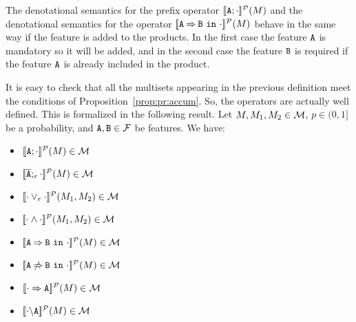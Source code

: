 The denotational semantics for the prefix operator
$[\![\mathtt{A};\cdot]\!]^{\cal P}(M)$
and the denotational semantics for the operator
$[\![\mathtt{A}\mathbin{\Rightarrow}\mathtt{B}\ \mathtt{in}\ \cdot]\!]^{\cal P}(M)$
behave in the same way if the feature is added
to the products. In the first case the feature $\mathtt{A}$ is mandatory
so it will be added, and in the second case the feature $\mathtt{B}$ is required
if the feature $\mathtt{A}$ is already included in the product.

It is easy to check that all the multisets appearing in the previous
definition meet the conditions of Proposition~\ref{prop:pr:accum}. So,
the operators are actually well defined. This is formalized in the
following result.
\bprop\label{prp:domain:prob}
  Let  $M,M_{1}, M_{2}\in{\cal M}$,
  $p\in(0,1]$ be a probability, and
  $\mathtt{A},\mathtt{B}\in{\cal F}$ be features. We have:
\begin{multicols}{2}
	\begin{itemize}
		\item $[\![\mathtt{A};\cdot]\!]^{\cal P}(M)\in{\cal M}$
		\item $[\![\overline{\mathtt{A}};_{r}\cdot]\!]^{\cal P}(M)\in{\cal M}$
		\item $[\![\cdot\mathbin{\lor}_{r}\cdot]\!]^{\cal P}(M_{1},M_{2})\in{\cal M}$
		\item $[\![\cdot\mathbin{\wedge}\cdot]\!]^{\cal P}(M_{1},M_{2})\in{\cal M}$
		\item $[\![\mathtt{A}\mathbin{\Rightarrow}\mathtt{B}\ \mathtt{in}\ \cdot]\!]^{\cal P}(M)\in{\cal M}$
		\item $[\![\mathtt{A}\mathbin{\not\Rightarrow}\mathtt{B}\ \mathtt{in}\ \cdot]\!]^{\cal P}(M)\in{\cal M}$
		\item $[\![\cdot\Rightarrow\mathtt{A}]\!]^{\cal P}(M)\in{\cal M}$
		\item $[\![\cdot\backslash\mathtt{A}]\!]^{\cal P}(M)\in{\cal M}$
	\end{itemize}
\end{multicols}
\eprop





